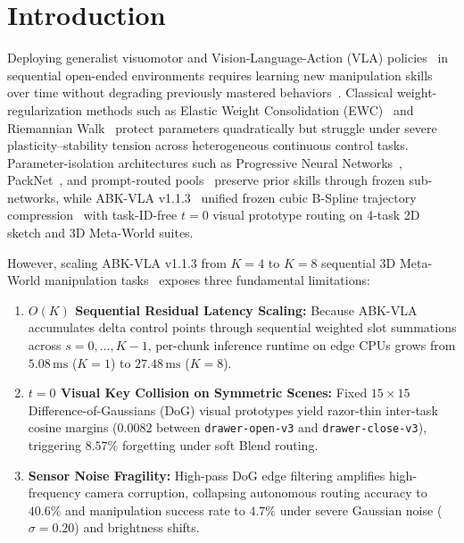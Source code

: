 \documentclass[10pt,twocolumn]{article}
\begin{document}
\section{Introduction}

Deploying generalist visuomotor and Vision-Language-Action (VLA) policies~\cite{kim2024openvla,zhao2023act,chi2023diffusion} in sequential open-ended environments requires learning new manipulation skills over time without degrading previously mastered behaviors~\cite{wolczyk2021continualworld,liu2023libero}. Classical weight-regularization methods such as Elastic Weight Consolidation (EWC)~\cite{kirkpatrick2017ewc} and Riemannian Walk~\cite{chaudhry2018riemannian} protect parameters quadratically but struggle under severe plasticity--stability tension across heterogeneous continuous control tasks. Parameter-isolation architectures such as Progressive Neural Networks~\cite{rusu2016progressive}, PackNet~\cite{mallya2018packnet}, and prompt-routed pools~\cite{wang2022l2p} preserve prior skills through frozen sub-networks, while ABK-VLA v1.1.3~\cite{son2026abkvla} unified frozen cubic B-Spline trajectory compression~\cite{paraschos2013promp} with task-ID-free $t=0$ visual prototype routing on 4-task 2D sketch and 3D Meta-World suites.

However, scaling ABK-VLA v1.1.3 from $K=4$ to $K=8$ sequential 3D Meta-World manipulation tasks~\cite{yu2020metaworld} exposes three fundamental limitations:
\begin{enumerate}[leftmargin=*,itemsep=2pt]
  \item \textbf{$O(K)$ Sequential Residual Latency Scaling:} Because ABK-VLA accumulates delta control points through sequential weighted slot summations across $s=0,\dots,K-1$, per-chunk inference runtime on edge CPUs grows from $5.08\,\text{ms}$ ($K=1$) to $27.48\,\text{ms}$ ($K=8$).
  \item \textbf{$t=0$ Visual Key Collision on Symmetric Scenes:} Fixed $15\times 15$ Difference-of-Gaussians (DoG) visual prototypes yield razor-thin inter-task cosine margins ($0.0082$ between \texttt{drawer-open-v3} and \texttt{drawer-close-v3}), triggering $8.57\%$ forgetting under soft Blend routing.
  \item \textbf{Sensor Noise Fragility:} High-pass DoG edge filtering amplifies high-frequency camera corruption, collapsing autonomous routing accuracy to $40.6\%$ and manipulation success rate to $4.7\%$ under severe Gaussian noise ($\sigma=0.20$) and brightness shifts.
\end{enumerate}
\end{document}
